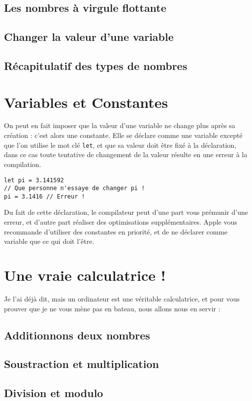 \subsection{Les nombres à virgule flottante}
\subsection{Changer la valeur d'une variable}
\subsection{Récapitulatif des types de nombres}
\section{Variables et Constantes}
On peut en fait imposer que la valeur d'une variable ne change plus après sa création :
c'est alors une constante. Elle se déclare comme une variable excepté que l'on utilise le
mot clé \texttt{let}, et que sa valeur doit être fixé à la déclaration, dans ce cas toute tentative de changement de la valeur résulte en une erreur à la compilation.
\begin{listing}[h]
\begin{verbatim}
let pi = 3.141592
// Que personne n'essaye de changer pi !
pi = 3.1416 // Erreur !
\end{verbatim}
\end{listing}
Du fait de cette déclaration, le compilateur peut d'une part vous prémunir d'une erreur, et
d'autre part réaliser des optimisations supplémentaires. Apple vous recommande d'utiliser
des constantes en priorité, et de ne déclarer comme variable que ce qui doit l'être.
\section{Une vraie calculatrice !}
Je l'ai déjà dit, mais un ordinateur est une véritable calculatrice, et pour vous prouver que
je ne vous mène pas en bateau, nous allons nous en servir :
\subsection{Additionnons deux nombres}
\subsection{Soustraction et multiplication}
\subsection{Division et modulo}

